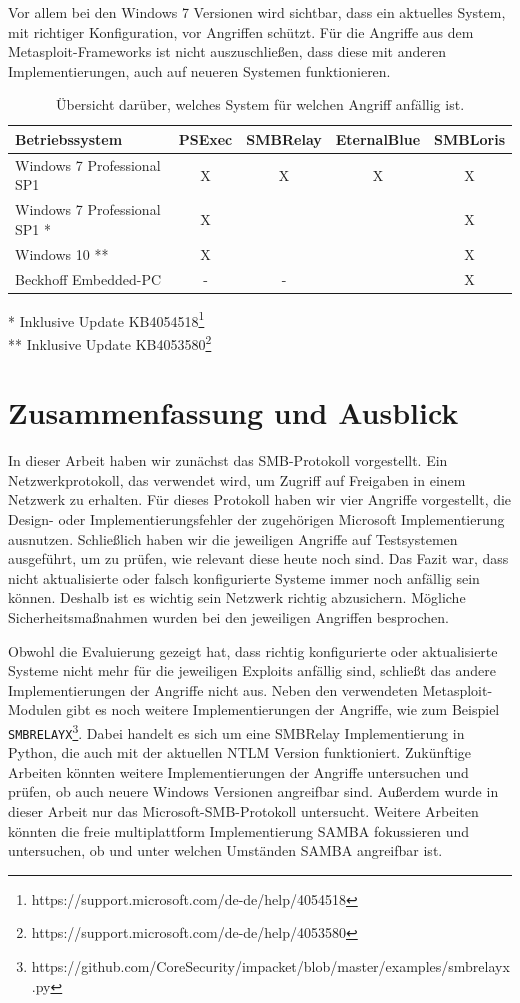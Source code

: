 \documentclass{AIFB_ITI_Crypto_Seminar}
\begin{document}
Vor allem bei den Windows 7 Versionen wird sichtbar, dass ein aktuelles System, mit richtiger Konfiguration, vor Angriffen schützt. Für die Angriffe aus dem Metasploit-Frameworks ist nicht auszuschließen, dass diese mit anderen Implementierungen, auch auf neueren Systemen funktionieren.
\begin{table}
\centering
\begin{tabular}{|l|c|c|c|c|}
\hline
Betriebssystem & PSExec & SMBRelay & EternalBlue & SMBLoris  \\ \hline
Windows 7 Professional SP1& X & X & X & X\\ \hline
Windows 7 Professional SP1 * & X & &  & X\\ \hline
Windows 10 ** & X &  &  & X \\ \hline
Beckhoff Embedded-PC & - & - &  & X \\ \hline
\end{tabular}
\caption{\label{tab:angriffs_ubersicht} Übersicht darüber, welches System für welchen Angriff anfällig ist.}
* Inklusive Update KB4054518\footnote{https://support.microsoft.com/de-de/help/4054518}  \\
** Inklusive Update KB4053580\footnote{https://support.microsoft.com/de-de/help/4053580} 
\end{table}
\section{Zusammenfassung und Ausblick}
\label{sec:zusammenfassung}
In dieser Arbeit haben wir zunächst das SMB-Protokoll vorgestellt. Ein Netzwerkprotokoll, das verwendet wird, um Zugriff auf Freigaben in einem Netzwerk zu erhalten. Für dieses Protokoll haben wir vier Angriffe vorgestellt, die Design- oder Implementierungsfehler der zugehörigen Microsoft Implementierung ausnutzen. Schließlich haben wir die jeweiligen Angriffe auf Testsystemen ausgeführt, um zu prüfen, wie relevant diese heute noch sind. Das Fazit war, dass nicht aktualisierte oder falsch konfigurierte Systeme immer noch anfällig sein können. Deshalb ist es wichtig sein Netzwerk richtig abzusichern. Mögliche Sicherheitsmaßnahmen wurden bei den jeweiligen Angriffen besprochen.\par
Obwohl die Evaluierung gezeigt hat, dass richtig konfigurierte oder aktualisierte Systeme nicht mehr für die jeweiligen Exploits anfällig sind, schließt das andere Implementierungen der Angriffe nicht aus. Neben den verwendeten Metasploit-Modulen gibt es noch weitere Implementierungen der Angriffe, wie zum Beispiel \texttt{SMBRELAYX}\footnote{https://github.com/CoreSecurity/impacket/blob/master/examples/smbrelayx.py}. Dabei handelt es sich um eine SMBRelay Implementierung in Python, die auch mit der aktuellen NTLM Version funktioniert. Zukünftige Arbeiten könnten weitere Implementierungen der Angriffe untersuchen und prüfen, ob auch neuere Windows Versionen angreifbar sind. Außerdem wurde in dieser Arbeit nur das Microsoft-SMB-Protokoll untersucht. Weitere Arbeiten könnten die freie multiplattform Implementierung SAMBA fokussieren und untersuchen, ob und unter welchen Umständen SAMBA angreifbar ist. 
%
%
\clearpage
\listoffigures
%
%
\clearpage
\printbibliography
	
\end{document}
